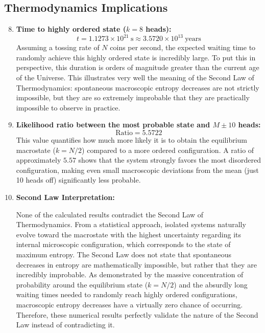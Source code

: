 \documentclass[11pt, a4paper]{article}
\begin{document}
\subsection{Thermodynamics Implications}
\begin{enumerate}[label=\alph*)]
    \setcounter{enumi}{7}
    
    \item \textbf{Time to highly ordered state ($k = 8$ heads):}
    \begin{equation} t = 1.1273 \times 10^{21} \ \text{s} \approx 3.5720 \times 10^{13} \ \text{years} \end{equation}
    Assuming a tossing rate of $N$ coins per second, the expected waiting time to randomly achieve this highly ordered state is incredibly large. To put this in perspective, this duration is orders of magnitude greater than the current age of the Universe. This illustrates very well the meaning of the Second Law of Thermodynamics: spontaneous macroscopic entropy decreases are not strictly impossible, but they are so extremely improbable that they are practically impossible to observe in practice.

    \vspace{0.3cm}
    \item \textbf{Likelihood ratio between the most probable state and $M \pm 10$ heads:}
    \begin{equation} \text{Ratio} = 5.5722 \end{equation} 
    This value quantifies how much more likely it is to obtain the equilibrium macrostate ($k = N/2$) compared to a more ordered configuration. A ratio of approximately $5.57$ shows that the system strongly favors the most disordered configuration, making even small macroscopic deviations from the mean (just 10 heads off) significantly less probable.
    
    \item \textbf{Second Law Interpretation:}

    
    None of the calculated results contradict the Second Law of Thermodynamics. From a statistical approach, isolated systems naturally evolve toward the macrostate with the highest uncertainty regarding its internal microscopic configuration, which corresponds to the state of maximum entropy. The Second Law does not state that spontaneous decreases in entropy are mathematically impossible, but rather that they are incredibly improbable. As demonstrated by the massive concentration of probability around the equilibrium state ($k = N/2$) and the absurdly long waiting times needed to randomly reach highly ordered configurations, macroscopic entropy decreases have a virtually zero chance of occurring. Therefore, these numerical results perfectly validate the nature of the Second Law instead of contradicting it.



\end{enumerate}
\end{document}
